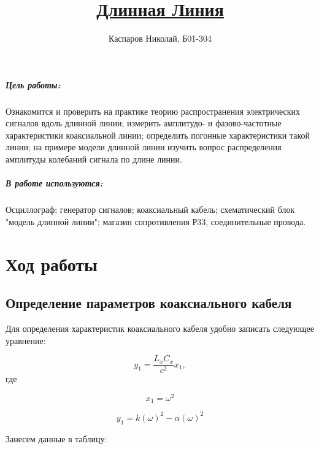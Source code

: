 \documentclass[a4paper]{article}
\title{\underline{Длинная Линия}}
\author{Каспаров Николай, Б01-304}
\begin{document}
\maketitle
\begin{center}
\Large{\textbf{ }}
\end{center}

\subparagraph{Цель работы:}

    Ознакомится и проверить на практике теорию распространения
    электрических сигналов вдоль длинной линии; измерить амплитудо- и фазово-частотные
    характеристики коаксиальной линии; определить погонные характеристики такой
    линии; на примере модели длинной линии изучить вопрос распределения амплитуды
    колебаний сигнала по длине линии.

\subparagraph{В работе используются:}

    Осциллограф; генератор сигналов; коаксиальный кабель; схематический блок "модель длинной линии"; магазин
    сопротивления Р33, соединительные провода.

\section{Ход работы}

\subsection{Определение параметров коаксиального кабеля}

Для определения характеристик коаксиального кабеля
удобно записать следующее уравнение:

\begin{equation}
    y_1 = \frac{L_x C_x}{c^2}x_1, 
\end{equation}
где

\begin{equation}
    x_1 = \omega^2
\end{equation}

\begin{equation}
    y_1 = k(\omega)^2 - \alpha (\omega)^2
\end{equation}

Занесем данные в таблицу:
\end{document}
